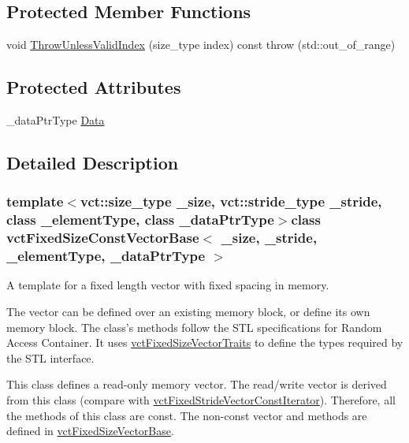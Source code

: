 \subsection*{Protected Member Functions}
\begin{DoxyCompactItemize}
\item 
void \hyperlink{classvct_fixed_size_const_vector_base_a3fb1938773c324fbb7c33c0304050dd8}{Throw\-Unless\-Valid\-Index} (size\-\_\-type index) const   throw (std\-::out\-\_\-of\-\_\-range)
\end{DoxyCompactItemize}
\subsection*{Protected Attributes}
\begin{DoxyCompactItemize}
\item 
\-\_\-data\-Ptr\-Type \hyperlink{classvct_fixed_size_const_vector_base_ad5bab7d48e82872547b8838ef74980ee}{Data}
\end{DoxyCompactItemize}


\subsection{Detailed Description}
\subsubsection*{template$<$vct\-::size\-\_\-type \-\_\-size, vct\-::stride\-\_\-type \-\_\-stride, class \-\_\-element\-Type, class \-\_\-data\-Ptr\-Type$>$class vct\-Fixed\-Size\-Const\-Vector\-Base$<$ \-\_\-size, \-\_\-stride, \-\_\-element\-Type, \-\_\-data\-Ptr\-Type $>$}

A template for a fixed length vector with fixed spacing in memory. 

The vector can be defined over an existing memory block, or define its own memory block. The class's methods follow the S\-T\-L specifications for Random Access Container. It uses \hyperlink{classvct_fixed_size_vector_traits}{vct\-Fixed\-Size\-Vector\-Traits} to define the types required by the S\-T\-L interface.

This class defines a read-\/only memory vector. The read/write vector is derived from this class (compare with \hyperlink{classvct_fixed_stride_vector_const_iterator}{vct\-Fixed\-Stride\-Vector\-Const\-Iterator}). Therefore, all the methods of this class are const. The non-\/const vector and methods are defined in \hyperlink{classvct_fixed_size_vector_base}{vct\-Fixed\-Size\-Vector\-Base}.

